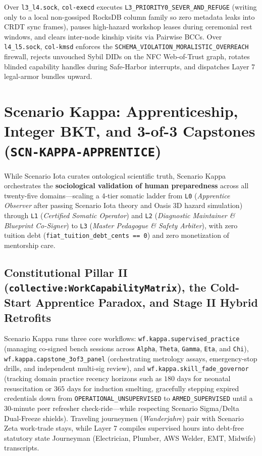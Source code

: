 Over \texttt{l3\_l4.sock}, \texttt{col-execd} executes \texttt{L3\_PRIORITY0\_SEVER\_AND\_REFUGE}
(writing only to a local non-gossiped RocksDB column family so zero metadata leaks into CRDT
sync frames), pauses high-hazard workshop leases during ceremonial rest windows, and clears
inter-node kinship visits via Pairwise BCCs. Over \texttt{l4\_l5.sock}, \texttt{col-kmsd}
enforces the \texttt{SCHEMA\_VIOLATION\_MORALISTIC\_OVERREACH} firewall, rejects unvouched
Sybil DIDs on the NFC Web-of-Trust graph, rotates blinded capability handles during
Safe-Harbor interrupts, and dispatches Layer 7 legal-armor bundles upward.

\section{Scenario Kappa: Apprenticeship, Integer BKT, and 3-of-3 Capstones (\texttt{SCN-KAPPA-APPRENTICE})}
\label{sec:wave-c-kappa}

While Scenario Iota curates ontological scientific truth, Scenario Kappa orchestrates the
\textbf{sociological validation of human preparedness} across all twenty-five domains---scaling a
4-tier somatic ladder from \texttt{L0} (\textit{Apprentice Observer} after passing Scenario
Iota theory and Oasis 3D hazard simulation) through \texttt{L1} (\textit{Certified Somatic
Operator}) and \texttt{L2} (\textit{Diagnostic Maintainer \& Blueprint Co-Signer}) to
\texttt{L3} (\textit{Master Pedagogue \& Safety Arbiter}), with zero tuition debt
(\texttt{fiat\_tuition\_debt\_cents == 0}) and zero monetization of mentorship care.

\subsection{Constitutional Pillar II (\texttt{collective:WorkCapabilityMatrix}), the Cold-Start Apprentice Paradox, and Stage II Hybrid Retrofits}

Scenario Kappa runs three core workflows: \texttt{wf.kappa.supervised\_practice} (managing
co-signed bench sessions across \texttt{Alpha}, \texttt{Theta}, \texttt{Gamma}, \texttt{Eta},
and \texttt{Chi}), \texttt{wf.kappa.capstone\_3of3\_panel} (orchestrating metrology assays,
emergency-stop drills, and independent multi-sig review), and \texttt{wf.kappa.skill\_fade\_governor}
(tracking domain practice recency horizons such as $180\text{ days}$ for neonatal
resuscitation or $365\text{ days}$ for induction smelting, gracefully stepping expired
credentials down from \texttt{OPERATIONAL\_UNSUPERVISED} to \texttt{ARMED\_SUPERVISED} until
a 30-minute peer refresher check-ride---while respecting Scenario Sigma/Delta Dual-Freeze
shields). Traveling journeymen (\textit{Wanderjahre}) pair with Scenario Zeta work-trade stays,
while Layer 7 compiles supervised hours into debt-free statutory state Journeyman
(Electrician, Plumber, AWS Welder, EMT, Midwife) transcripts.

